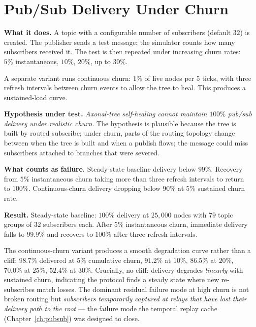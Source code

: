 \documentclass[twoside,nobib]{tufte-book}
\begin{document}
\section{Pub/Sub Delivery Under Churn}

\textbf{What it does.} A topic with a configurable number of
subscribers (default $32$) is created. The publisher sends a
test message; the simulator counts how many subscribers
received it. The test is then repeated under increasing churn
rates: $5\%$ instantaneous, $10\%$, $20\%$, up to $30\%$.

A separate variant runs continuous churn: $1\%$ of live nodes
per $5$ ticks, with three refresh intervals between churn
events to allow the tree to heal. This produces a
sustained-load curve.

\textbf{Hypothesis under test.} \emph{Axonal-tree self-healing
cannot maintain $100\%$ pub/sub delivery under realistic
churn.} The hypothesis is plausible because the tree is built
by routed subscribe; under churn, parts of the routing
topology change between when the tree is built and when a
publish flows; the message could miss subscribers attached to
branches that were severed.

\textbf{What counts as failure.} Steady-state baseline delivery
below $99\%$. Recovery from $5\%$ instantaneous churn taking
more than three refresh intervals to return to $100\%$.
Continuous-churn delivery dropping below $90\%$ at $5\%$
sustained churn rate.

\textbf{Result.} Steady-state baseline: $100\%$ delivery at
$25{,}000$ nodes with $79$ topic groups of $32$ subscribers
each. After $5\%$ instantaneous churn, immediate delivery
falls to $99.9\%$ and recovers to $100\%$ after three refresh
intervals.

The continuous-churn variant produces a smooth degradation
curve rather than a cliff: $98.7\%$ delivered at $5\%$
cumulative churn, $91.2\%$ at $10\%$, $86.5\%$ at $20\%$,
$70.0\%$ at $25\%$, $52.4\%$ at $30\%$. Crucially, no cliff:
delivery degrades \emph{linearly} with sustained churn,
indicating the protocol finds a steady state where new
re-subscribes match losses. The dominant residual failure mode
at high churn is not broken routing but \emph{subscribers
temporarily captured at relays that have lost their delivery
path to the root} --- the failure mode the temporal replay
cache (Chapter~\ref{ch:pubsub}) was designed to close.
\end{document}
